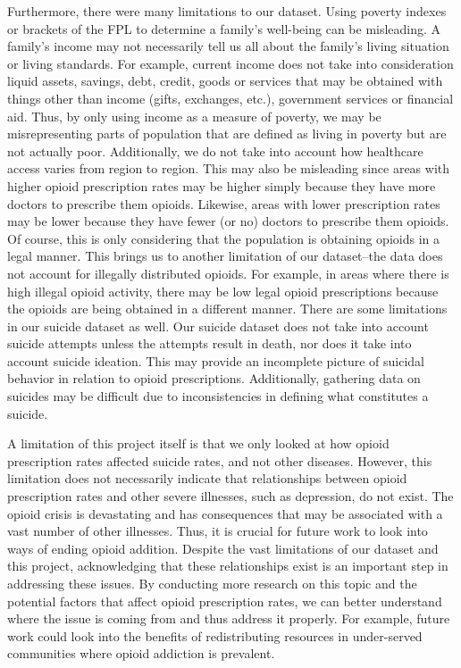 \documentclass{article}
\newcommand{\<}{\langle}
\renewcommand{\>}{\rangle}
\theoremstyle{definition}
\begin{document}
Furthermore, there were many limitations to our dataset. Using poverty indexes or brackets of the FPL to determine a family's well-being can be misleading. A family's income may not necessarily tell us all about the family's living situation or living standards. For example, current income does not take into consideration liquid assets, savings, debt, credit, goods or services that may be obtained with things other than income (gifts, exchanges, etc.), government services or financial aid. Thus, by only using income as a measure of poverty, we may be misrepresenting parts of population that are defined as living in poverty but are not actually poor. Additionally, we do not take into account how healthcare access varies from region to region. This may also be misleading since areas with higher opioid prescription rates may be higher simply because they have more doctors to prescribe them opioids. Likewise, areas with lower prescription rates may be lower because they have fewer (or no) doctors to prescribe them opioids. Of course, this is only considering that the population is obtaining opioids in a legal manner. This brings us to another limitation of our dataset–the data does not account for illegally distributed opioids. For example, in areas where there is high illegal opioid activity, there may be low legal opioid prescriptions because the opioids are being obtained in a different manner. There are some limitations in our suicide dataset as well. Our suicide dataset does not take into account suicide attempts unless the attempts result in death, nor does it take into account suicide ideation. This may provide an incomplete picture of suicidal behavior in relation to opioid prescriptions. Additionally, gathering data on suicides may be difficult due to inconsistencies in defining what constitutes a suicide. 

A limitation of this project itself is that we only looked at how opioid prescription rates affected suicide rates, and not other diseases. However, this limitation does not necessarily indicate that relationships between opioid prescription rates and other severe illnesses, such as depression, do not exist. The opioid crisis is devastating and has consequences that may be associated with a vast number of other illnesses. Thus, it is crucial for future work to look into ways of ending opioid addition. Despite the vast limitations of our dataset and this project, acknowledging that these relationships exist is an important step in addressing these issues.  By conducting more research on this topic and the potential factors that affect opioid prescription rates, we can better understand where the issue is coming from and thus address it properly. For example, future work could look into the benefits of redistributing resources in under-served communities where opioid addiction is prevalent. 
\end{document}
